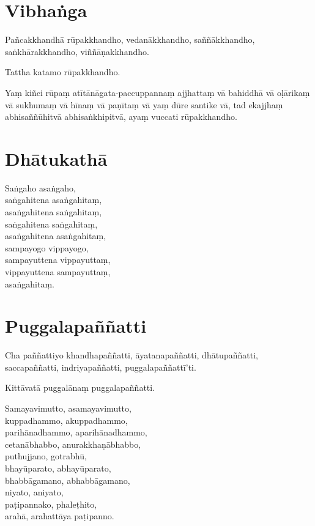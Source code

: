 

\section{Vibhaṅga}

Pañcakkhandhā rūpakkhandho, vedanākkhandho, saññākkhandho, saṅkhārakkhandho,
viññāṇakkhandho.

Tattha katamo rūpakkhandho.

Yaṃ kiñci rūpaṃ atītānāgata-paccuppannaṃ ajjhattaṃ vā bahiddhā vā oḷārikaṃ vā
sukhumaṃ vā hīnaṃ vā paṇītaṃ vā yaṃ dūre santike vā, tad ekajjhaṃ
abhisaññūhitvā abhisaṅkhipitvā, ayaṃ vuccati rūpakkhandho.



\section{Dhātukathā}

Saṅgaho asaṅgaho,\\
saṅgahitena asaṅgahitaṃ,\\
asaṅgahitena saṅgahitaṃ,\\
saṅgahitena saṅgahitaṃ,\\
asaṅgahitena asaṅgahitaṃ,\\
sampayogo vippayogo,\\
sampayuttena vippayuttaṃ,\\
vippayuttena sampayuttaṃ,\\
asaṅgahitaṃ.



\section{Puggalapaññatti}

Cha paññattiyo khandhapaññatti, āyatanapaññatti, dhātupaññatti, saccapaññatti,
indriyapaññatti, puggalapaññattī'ti.

Kittāvatā puggalānaṃ puggalapaññatti.

Samayavimutto, asamayavimutto,\\
kuppadhammo, akuppadhammo,\\
parihānadhammo, aparihānadhammo,\\
cetanābhabbo, anurakkhaṇābhabbo,\\
puthujjano, gotrabhū,\\
bhayūparato, abhayūparato,\\
bhabbāgamano, abhabbāgamano,\\
niyato, aniyato,\\
paṭipannako, phaleṭhito,\\
arahā, arahattāya paṭipanno.

